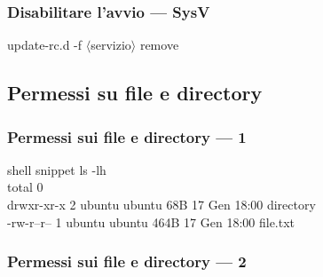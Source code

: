 \documentclass{beamer}
\newenvironment{shell}{\par\vspace{.5em}\begin{beamercolorbox}[rounded=true,sep=.2em]{shell snippet}\ttfamily {\color{blue}\$}}{\end{beamercolorbox}}
\newenvironment{shell*}{\par\vspace{.5em}\begin{beamercolorbox}[rounded=true,sep=.2em]{shell snippet}\ttfamily {\color{red}\#}}{\end{beamercolorbox}}
\newcommand{\param}[1]{$\langle$#1$\rangle$}
\begin{document}
\begin{frame}
  \frametitle{Disabilitare l'avvio --- SysV}
  
  \begin{shell*}
    update-rc.d -f \alert{\param{servizio}} remove
  \end{shell*}
\end{frame}

\subsection{Permessi su file e directory}

\begin{frame}
  \frametitle{Permessi sui file e directory --- 1}

  \begin{shell}
    ls -lh\\
    total 0\\
    \alert<4>{drwxr-xr-x}	2 \alert<2>{ubuntu}   \alert<3>{ubuntu}	  68B
    17 Gen 18:00  directory\\
    \alert<4>{-rw-r--r--}	1 \alert<2>{ubuntu}   \alert<3>{ubuntu}  464B
    17 Gen 18:00  file.txt
  \end{shell}

\end{frame}

\begin{frame}
  \frametitle{Permessi sui file e directory --- 2}

\end{frame}
\end{document}
